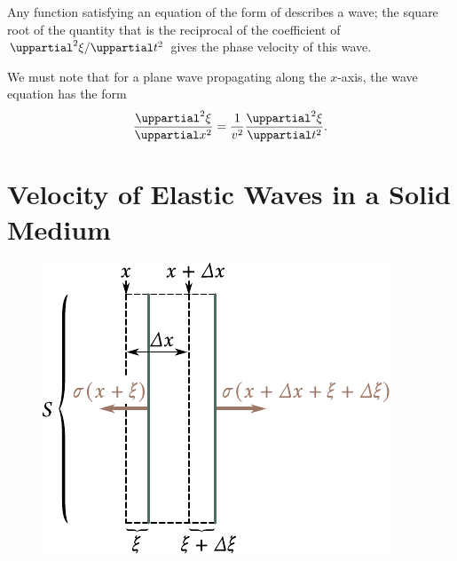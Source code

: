 Any function satisfying an equation of the form of  describes a wave; the square root of the quantity that is the reciprocal of the coefficient of $\diffnpartialin{\xi}{t}{2}$ gives the phase velocity of this wave.

We must note that for a plane wave propagating along the $x$-axis, the wave equation has the form
\begin{equation}\label{eq:14_29}
    \diffnpartial{\xi}{x}{2} = \frac{1}{v^2} \diffnpartial{\xi}{t}{2}.
\end{equation}

\section{Velocity of Elastic Waves in a Solid Medium}\label{sec:14_5}

\begin{figure}[t]
	\begin{center}
		\includegraphics[scale=1]{figures/ch_14/fig_14_6.pdf}
		\caption[]{}
		\label{fig:14_6}
	\end{center}
	\vspace{-0.8cm}
\end{figure}

